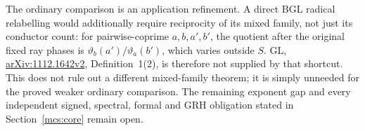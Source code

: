 \documentclass[11pt,oneside,openany]{book}
\theoremstyle{definition}\newtheorem{definition}[theorem]{Definition}
\theoremstyle{remark}\newtheorem{remark}[theorem]{Remark}
\begin{document}
The ordinary comparison is an application refinement. A direct BGL
radical relabelling would additionally require reciprocity of its mixed
family, not just its conductor count: for pairwise-coprime $a,b,a',b'$,
the quotient after the original fixed ray phases is
$\vartheta_b(a')/\vartheta_a(b')$, which varies outside $S$.
GL, \href{https://arxiv.org/pdf/1112.1642v2}{arXiv:1112.1642v2},
Definition~1(2), is therefore not supplied by that shortcut.
This does not rule out a different mixed-family theorem; it is simply
unneeded for the proved weaker ordinary comparison.
The remaining exponent gap and every independent signed, spectral,
formal and GRH obligation stated in Section~\ref{mcs:core} remain open.


\backmatter
\end{document}

